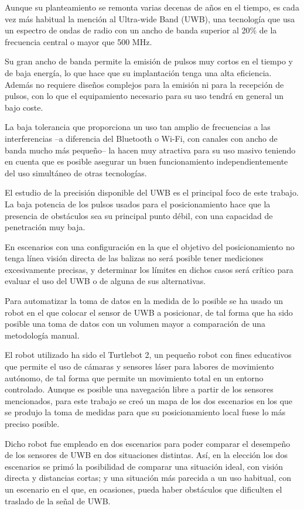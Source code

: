 Aunque su planteamiento se remonta varias decenas de años en el tiempo, es cada vez más habitual la mención al Ultra-wide Band (UWB), una tecnología que usa un espectro de ondas de radio con un ancho de banda superior al 20\% de la frecuencia central o mayor que 500 MHz.

Su gran ancho de banda permite la emisión de pulsos muy cortos en el tiempo y de baja energía, lo que hace que su implantación tenga una alta eficiencia.
Además no requiere diseños complejos para la emisión ni para la recepción de pulsos, con lo que el equipamiento necesario para su uso tendrá en general un bajo coste.

La baja tolerancia que proporciona un uso tan amplio de frecuencias a las interferencias --a diferencia del Bluetooth o Wi-Fi, con canales con ancho de banda mucho más pequeño-- la hacen muy atractiva para su uso masivo teniendo en cuenta que es posible asegurar un buen funcionamiento independientemente del uso simultáneo de otras tecnologías.

El estudio de la precisión disponible del UWB es el principal foco de este trabajo.
La baja potencia de los pulsos usados para el posicionamiento hace que la presencia de obstáculos sea su principal punto débil, con una capacidad de penetración muy baja.

En escenarios con una configuración en la que el objetivo del posicionamiento no tenga línea visión directa de las balizas no será posible tener mediciones excesivamente precisas, y determinar los límites en dichos casos será crítico para evaluar el uso del UWB o de alguna de sus alternativas.

Para automatizar la toma de datos en la medida de lo posible se ha usado un robot en el que colocar el sensor de UWB a posicionar, de tal forma que ha sido posible una toma de datos con un volumen mayor a comparación de una metodología manual.

El robot utilizado ha sido el Turtlebot 2, un pequeño robot con fines educativos que permite el uso de cámaras y sensores láser para labores de movimiento autónomo, de tal forma que permite un movimiento total en un entorno controlado.
Aunque es posible una navegación libre a partir de los sensores mencionados, para este trabajo se creó un mapa de los dos escenarios en los que se produjo la toma de medidas para que su posicionamiento local fuese lo más preciso posible.

Dicho robot fue empleado en dos escenarios para poder comparar el desempeño de los sensores de UWB en dos situaciones distintas.
Así, en la elección los dos escenarios se primó la posibilidad de comparar una situación ideal, con visión directa y distancias cortas; y una situación más parecida a un uso habitual, con un escenario en el que, en ocasiones, pueda haber obstáculos que dificulten el traslado de la señal de UWB.

